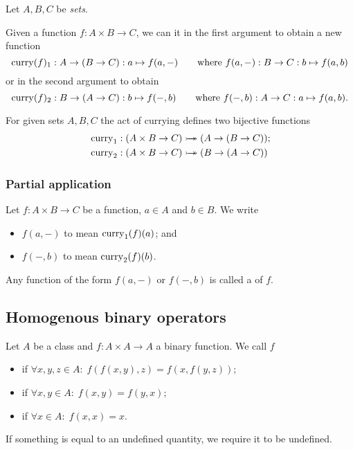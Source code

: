\begin{definition}
Let $A,B,C$ be \emph{sets}.

Given a function $f: A\times B \to C$, we can  it in the first argument to obtain a new function
\[ \operatorname{curry}(f)_1: A \to (B\to C): a\mapsto f(a,-) \qquad \text{where $f(a,-): B \to C: b\mapsto f(a,b)$} \]
or in the second argument to obtain
\[ \operatorname{curry}(f)_2: B \to (A\to C): b\mapsto f(-,b) \qquad \text{where $f(-,b): A \to C: a\mapsto f(a,b)$}. \]
\end{definition}
\begin{lemma}
For given sets $A,B,C$ the act of currying defines two bijective functions
\begin{align*}
&\operatorname{curry}_1: (A\times B \to C) \mathrel{\rightarrowtail\kern-1.9ex\twoheadrightarrow} (A \to (B\to C)); \\
&\operatorname{curry}_2: (A\times B \to C) \mathrel{\rightarrowtail\kern-1.9ex\twoheadrightarrow} (B \to (A\to C))
\end{align*}
\end{lemma}

\subsubsection{Partial application}
\begin{definition}
Let $f: A\times B \to C$ be a function, $a\in A$ and $b\in B$. We write
\begin{itemize}
\item $f(a, -)$ to mean $\operatorname{curry}_1(f)(a)$; and
\item $f(-, b)$ to mean $\operatorname{curry}_2(f)(b)$.
\end{itemize}
Any function of the form $f(a, -)$ or $f(-,b)$ is called a  of $f$.
\end{definition}

\subsection{Homogenous binary operators}
\begin{definition}
Let $A$ be a class and $f: A\times A \to A$ a binary function. We call $f$
\begin{itemize}
\item {} if $\forall x,y, z\in A: \; f(f(x,y),z) = f(x,f(y,z))$;
\item {} if $\forall x,y\in A: \; f(x,y) = f(y,x)$;
\item {} if $\forall x\in A:\; f(x,x) = x$.
\end{itemize}
If something is equal to an undefined quantity, we require it to be undefined.
\end{definition}


